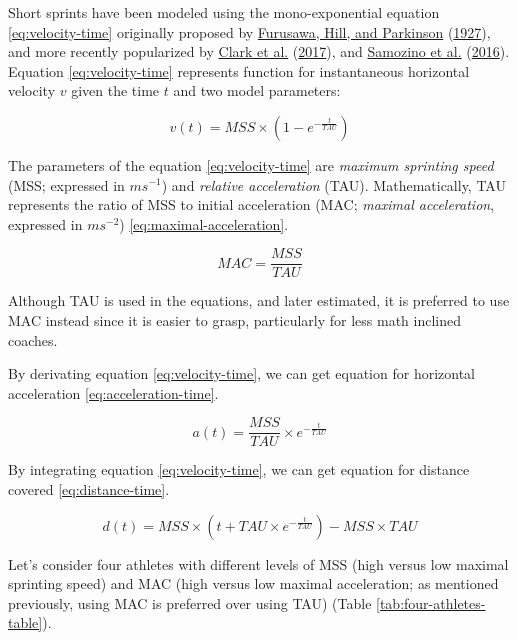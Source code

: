 \documentclass[fleqn,10pt,lineno]{wlpeerj} %
\begin{document}
Short sprints have been modeled using the mono-exponential equation \eqref{eq:velocity-time} originally proposed by \protect\hyperlink{ref-doi:10.1098ux2frspb.1927.0035}{Furusawa, Hill, and Parkinson} (\protect\hyperlink{ref-doi:10.1098ux2frspb.1927.0035}{1927}), and more recently popularized by \protect\hyperlink{ref-clarkNFLCombine40Yard2017}{Clark et al.} (\protect\hyperlink{ref-clarkNFLCombine40Yard2017}{2017}), and \protect\hyperlink{ref-samozinoSimpleMethodMeasuring2016}{Samozino et al.} (\protect\hyperlink{ref-samozinoSimpleMethodMeasuring2016}{2016}). Equation \eqref{eq:velocity-time} represents function for instantaneous horizontal velocity \(v\) given the time \(t\) and two model parameters:

\begin{equation}
  v(t) = MSS \times (1 - e^{-\frac{t}{TAU}}) \label{eq:velocity-time}
\end{equation}

The parameters of the equation \eqref{eq:velocity-time} are \emph{maximum sprinting speed} (MSS; expressed in \(ms^{-1}\)) and \emph{relative acceleration} (TAU). Mathematically, TAU represents the ratio of MSS to initial acceleration (MAC; \emph{maximal acceleration}, expressed in \(ms^{-2}\)) \eqref{eq:maximal-acceleration}.

\begin{equation}
  MAC = \frac{MSS}{TAU}\label{eq:maximal-acceleration}
\end{equation}

Although TAU is used in the equations, and later estimated, it is preferred to use MAC instead since it is easier to grasp, particularly for less math inclined coaches.

By derivating equation \eqref{eq:velocity-time}, we can get equation for horizontal acceleration \eqref{eq:acceleration-time}.

\begin{equation}
  a(t) = \frac{MSS}{TAU} \times e^{-\frac{t}{TAU}}  \label{eq:acceleration-time}
\end{equation}

By integrating equation \eqref{eq:velocity-time}, we can get equation for distance covered \eqref{eq:distance-time}.

\begin{equation}
  d(t) = MSS \times (t + TAU \times e^{-\frac{t}{TAU}}) - MSS \times TAU  \label{eq:distance-time}
\end{equation}

Let's consider four athletes with different levels of MSS (high versus low maximal sprinting speed) and MAC (high versus low maximal acceleration; as mentioned previously, using MAC is preferred over using TAU) (Table \ref{tab:four-athletes-table}).
\end{document}
